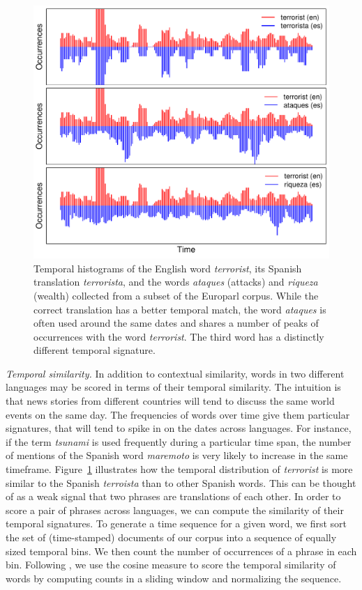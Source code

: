 \documentclass[11pt]{article}
\newcommand{\figref}[1]{Figure~\ref{#1}}
\begin{document}
\begin{figure}[t]
\includegraphics[width= \linewidth]{../figures/temporal/temporal}
\caption{Temporal histograms of the English word {\em terrorist}, its Spanish translation {\em terrorista}, and the words {\em ataques}  (attacks) and {\em riqueza} (wealth) collected from a subset of the Europarl corpus. While the correct translation has a better temporal match, the word {\em ataques} is often used around the same dates and shares a number of peaks of occurrences with the word {\em terrorist}.  The third word has a distinctly different temporal signature.}
\label{fig:temporal}
\end{figure}

\noindent\emph{Temporal similarity.} In addition to contextual similarity, words in two different languages may be scored in terms of their temporal similarity.  The intuition is that news stories from different countries will tend to discuss the same world events on the same day.  The frequencies of words over time give them particular signatures, that will tend to spike in on the dates across languages.  For instance, if the term {\it tsunami} is used frequently during a particular time span, the number of mentions of the Spanish word {\it maremoto} is very likely to increase in the same timeframe.     \figref{fig:temporal} illustrates how the temporal distribution of {\it terrorist} is more similar to the Spanish {\it terroista} than to other Spanish words.  This can be thought of as a weak signal that two phrases are translations of each other.  In order to score a pair of phrases across languages, we can compute the similarity of their temporal signatures. To generate a time sequence for a given word, we first sort the set of (time-stamped) documents of our corpus into a sequence of equally sized temporal bins.  We then count the number of occurrences of a phrase in each bin.  Following , we use the cosine measure to score the temporal similarity of words by computing counts in a sliding window and normalizing the sequence. 
\end{document}
